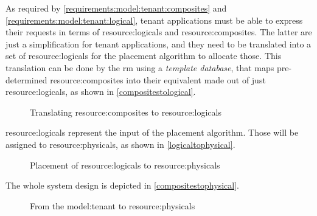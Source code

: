 As required by \ref{requirements:model:tenant:composites} and \ref{requirements:model:tenant:logical}, tenant applications must be able to express their requests in terms of \glspl{resource:logical} and \glspl{resource:composite}.
The latter are just a simplification for tenant applications, and they need to be translated into a set of \glspl{resource:logical} for the placement algorithm to allocate those.
This translation can be done by the \gls{rm} using a \textit{template database}, that maps pre-determined \glspl{resource:composite} into their equivalent made out of just \glspl{resource:logical}, as shown in \autoref{compositestological}.

\begin{figure}[!htb]
    \centering
    \usebox{\compositestological}
    \caption{Translating \glspl{resource:composite} to \glspl{resource:logical}}
    \label{compositestological}
\end{figure}

\Glspl{resource:logical} represent the input of the placement algorithm. Those will be assigned to \glspl{resource:physical}, as shown in \autoref{logicaltophysical}.

\begin{figure}[!htb]
    \centering
    \usebox{\logicaltophysical}
    \caption{Placement of \glspl{resource:logical} to \glspl{resource:physical}}
    \label{logicaltophysical}
\end{figure}

The whole system design is depicted in \autoref{compositestophysical}.

\begin{figure}[!htb]
    \centering
    \usebox{\compositestophysical}
    \caption{From the \gls{model:tenant} to \glspl{resource:physical}}
    \label{compositestophysical}
\end{figure}